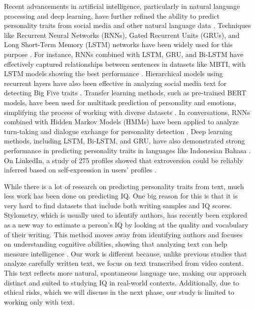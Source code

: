 \documentclass[10pt,conference,compsocconf]{IEEEtran}
\begin{document}
Recent advancements in artificial intelligence, particularly in natural language processing and deep learning, have further refined the ability to predict personality traits from social media and other natural language data \cite{Vinciarelli2014}. Techniques like Recurrent Neural Networks (RNNs), Gated Recurrent Units (GRUs), and Long Short-Term Memory (LSTM) networks have been widely used for this purpose \cite{Majumder2017}. For instance, RNNs combined with LSTM, GRU, and Bi-LSTM have effectively captured relationships between sentences in datasets like MBTI, with LSTM models showing the best performance \cite{Hernandez2017}. Hierarchical models using recurrent layers have also been effective in analyzing social media text for detecting Big Five traits \cite{Xue2018}. Transfer learning methods, such as pre-trained BERT models, have been used for multitask prediction of personality and emotions, simplifying the process of working with diverse datasets \cite{Li2021}. In conversations, RNNs combined with Hidden Markov Models (HMMs) have been applied to analyze turn-taking and dialogue exchange for personality detection \cite{Su2016}. Deep learning methods, including LSTM, Bi-LSTM, and GRU, have also demonstrated strong performance in predicting personality traits in languages like Indonesian Bahasa \cite{Jeremy2021}. On LinkedIn, a study of 275 profiles showed that extroversion could be reliably inferred based on self-expression in users’ profiles \cite{VandeVen2017}.

While there is a lot of research on predicting personality traits from text, much less work has been done on predicting IQ. One big reason for this is that it is very hard to find datasets that include both writing samples and IQ scores. Stylometry, which is usually used to identify authors, has recently been explored as a new way to estimate a person’s IQ by looking at the quality and vocabulary of their writing. This method moves away from identifying authors and focuses on understanding cognitive abilities, showing that analyzing text can help measure intelligence \cite{Hendrix2017}. Our work is different because, unlike previous studies that analyze carefully written text, we focus on text transcribed from video content. This text reflects more natural, spontaneous language use, making our approach distinct and suited to studying IQ in real-world contexts. Additionally, due to ethical risks, which we will discuss in the next phase, our study is limited to working only with text.

\newpage
\end{document}
